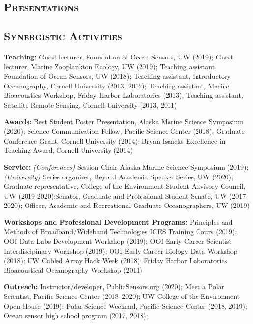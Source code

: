 \documentclass[svgnames,12pt,a4paper]{article}
\begin{document}
\vspace*{-.7cm}
\subsection*{\textsc{Presentations}}
\vspace*{-.1cm}

\vspace*{-.5cm}
\subsection*{\textsc{Synergistic Activities}}

\begin{bibenum}[itemsep=4pt]

    \item \textbf{Teaching:} Guest lecturer, Foundation of Ocean Sensors, UW (2019); Guest lecturer, Marine Zooplankton Ecology, UW (2019); Teaching assistant, Foundation of Ocean Sensors, UW (2018); Teaching assistant, Introductory Oceanography, Cornell University (2013, 2012); Teaching assistant, Marine Bioacoustics Workshop, Friday Harbor Laboratories (2013); Teaching assistant, Satellite Remote Sensing, Cornell University (2013, 2011)

    \item \textbf{Awards:} Best Student Poster Presentation, Alaska Marine Science Symposium (2020); Science Communication Fellow, Pacific Science Center (2018); Graduate Conference Grant, Cornell University (2014); Bryan Isaacks Excellence in Teaching Award, Cornell University (2014) 

    \item \textbf{Service:} \textit{(Conferences)} Session Chair Alaska Marine Science Symposium (2019); \textit{(University)} Series organizer, Beyond Academia Speaker Series, UW (2020); Graduate representative, College of the Environment Student Advisory Council, UW (2019-2020);Senator, Graduate and Professional Student Senate, UW (2017-2020); Officer, Academic and Recreational Graduate Oceanographers, UW (2019)
    
    \item \textbf{Workshops and Professional Development Programs:}  Principles and Methods of Broadband/Wideband Technologies ICES Training Cours (2019); OOI Data Labs Development Workshop (2019); OOI Early Career Scientist Interdiscipinary Workshop (2019); OOI Early Career Biology Data Workshop (2018); UW Cabled Array Hack Week (2018); Friday Harbor Laboratories Bioacoustical Oceanography Workshop (2011)
    
    \item \textbf{Outreach:} Instructor/developer, PublicSensors.org (2020); Meet a Polar Scientist, Pacific Science Center (2018--2020); UW College of the Environment Open House (2019); Polar Science Weekend, Pacific Science Center (2018, 2019); Ocean sensor high school program (2017, 2018);

\end{bibenum}

%
\end{document}
